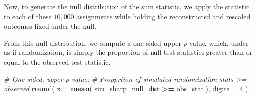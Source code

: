 \documentclass[
  12pt,
  leqno]{article}
\newenvironment{Shaded}{\begin{snugshade}}{\end{snugshade}}
\newcommand{\AttributeTok}[1]{\textcolor[rgb]{0.13,0.29,0.53}{#1}}
\newcommand{\CommentTok}[1]{\textcolor[rgb]{0.56,0.35,0.01}{\textit{#1}}}
\newcommand{\ControlFlowTok}[1]{\textcolor[rgb]{0.13,0.29,0.53}{\textbf{#1}}}
\newcommand{\DecValTok}[1]{\textcolor[rgb]{0.00,0.00,0.81}{#1}}
\newcommand{\FunctionTok}[1]{\textcolor[rgb]{0.13,0.29,0.53}{\textbf{#1}}}
\newcommand{\NormalTok}[1]{#1}
\newcommand{\OtherTok}[1]{\textcolor[rgb]{0.56,0.35,0.01}{#1}}
\newcommand{\SpecialCharTok}[1]{\textcolor[rgb]{0.81,0.36,0.00}{\textbf{#1}}}
\begin{document}
\doublespacing

Now, to generate the null distribution of the sum statistic, we apply
the statistic to each of these \(10{,}000\) assignments while holding
the reconstructed and rescaled outcomes fixed under the null.

\singlespacing

\begin{Shaded}
\end{Shaded}

\doublespacing

From this null distribution, we compute a one-sided upper \(p\)-value,
which, under as-if randomization, is simply the proportion of null test
statistics greater than or equal to the observed test statistic.

\singlespacing

\begin{Shaded}
\begin{Highlighting}[]
\CommentTok{\# One{-}sided, upper p{-}value:}
\CommentTok{\# Propprtion of simulated randomization stats \textgreater{}= observed}
\FunctionTok{round}\NormalTok{(}
  \AttributeTok{x =} \FunctionTok{mean}\NormalTok{(}
\NormalTok{    sim\_sharp\_null\_dist }\SpecialCharTok{\textgreater{}=}\NormalTok{ obs\_stat}
\NormalTok{  ),}
  \AttributeTok{digits =} \DecValTok{4}
\NormalTok{)}
\end{Highlighting}
\end{Shaded}
\end{document}
